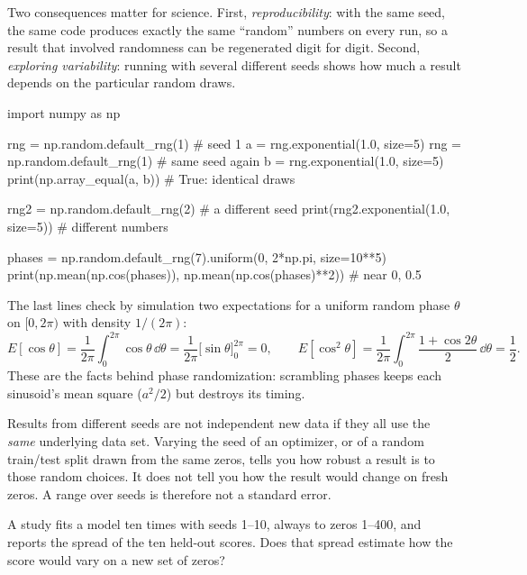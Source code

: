 Two consequences matter for science. First, \emph{reproducibility}: with the same seed, the same code produces exactly the same ``random'' numbers on every run, so a result that involved randomness can be regenerated digit for digit. Second, \emph{exploring variability}: running with several different seeds shows how much a result depends on the particular random draws.

\begin{pycode}
import numpy as np

rng = np.random.default_rng(1)        # seed 1
a = rng.exponential(1.0, size=5)
rng = np.random.default_rng(1)        # same seed again
b = rng.exponential(1.0, size=5)
print(np.array_equal(a, b))           # True: identical draws

rng2 = np.random.default_rng(2)       # a different seed
print(rng2.exponential(1.0, size=5))  # different numbers

phases = np.random.default_rng(7).uniform(0, 2*np.pi, size=10**5)
print(np.mean(np.cos(phases)), np.mean(np.cos(phases)**2))  # near 0, 0.5
\end{pycode}

The last lines check by simulation two expectations for a uniform random phase $\theta$ on $[0,2\pi)$ with density $1/(2\pi)$:
\[
E[\cos\theta]=\frac1{2\pi}\int_0^{2\pi}\cos\theta\,\dd\theta=\frac{1}{2\pi}\bigl[\sin\theta\bigr]_0^{2\pi}=0,\qquad
E[\cos^2\theta]=\frac1{2\pi}\int_0^{2\pi}\frac{1+\cos2\theta}{2}\,\dd\theta=\frac12 .
\]
These are the facts behind phase randomization: scrambling phases keeps each sinusoid's mean square ($a^2/2$) but destroys its timing.

\begin{pitfall}
Results from different seeds are not independent new data if they all use the \emph{same} underlying data set. Varying the seed of an optimizer, or of a random train/test split drawn from the same zeros, tells you how robust a result is to those random choices. It does not tell you how the result would change on fresh zeros. A range over seeds is therefore not a standard error.
\end{pitfall}

\begin{checkpoint}
A study fits a model ten times with seeds 1--10, always to zeros 1--400, and reports the spread of the ten held-out scores. Does that spread estimate how the score would vary on a new set of zeros?
\end{checkpoint}

